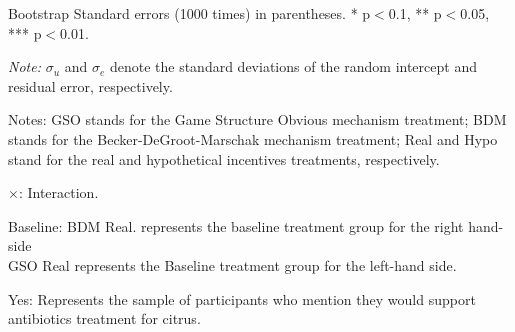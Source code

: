 \documentclass[12pt]{article}
\begin{document}
\begin{table}[H]
\begin{tablenotes}
            \footnotesize
            \item Bootstrap Standard errors (1000 times) in parentheses. * p$<$0.1, ** p$<$0.05, *** p$<$0.01.
            \item \textit{Note:} $\sigma_u$ and $\sigma_e$ denote the standard deviations of the random intercept and residual error, respectively.
            \item Notes: GSO stands for the Game Structure Obvious mechanism treatment; BDM stands for the Becker-DeGroot-Marschak mechanism treatment; Real and Hypo stand for the real and hypothetical incentives treatments, respectively.
           \item $\times$: Interaction.
           \item Baseline: BDM Real. represents the baseline treatment group for the right hand-side \\
           GSO Real represents the Baseline treatment group for the left-hand side.
           \item Yes: Represents the sample of participants who mention they would support antibiotics treatment for citrus.
        \end{tablenotes}
\end{table}

\clearpage
\end{document}
